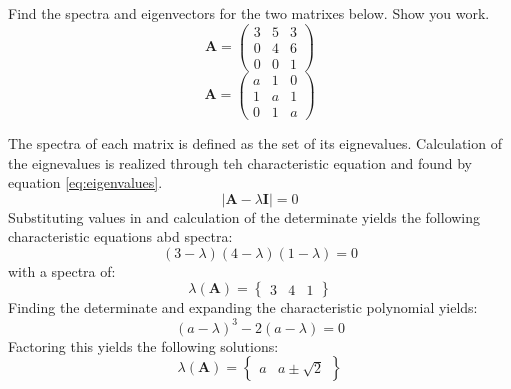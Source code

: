 Find the spectra and eigenvectors for the two matrixes below. Show you work.
\begin{equation*}\boldsymbol{A}=
	\begin{pmatrix}
		3&5&3\\0&4&6\\0&0&1
	\end{pmatrix}
\end{equation*}
\begin{equation*}
	\boldsymbol{A}=
	\begin{pmatrix}
		a&1&0\\1&a&1\\0&1&a
	\end{pmatrix}
\end{equation*}

The spectra of each matrix is defined as the set of its eignevalues. Calculation of the eignevalues is realized through teh characteristic equation and found by equation \ref{eq:eigenvalues}.
\begin{equation}
	\vert \boldsymbol{A}-\lambda\boldsymbol{I}\vert=0
	\label{eq:eigenvalues}
\end{equation}
Substituting values in and calculation of the determinate yields the following characteristic equations abd spectra:
\begin{equation*}
	\left(3-\lambda\right)\left(4-\lambda\right)\left(1-\lambda\right)=0
\end{equation*}
with a spectra of:
\begin{equation*}
	\boxed{
	\lambda\left(\boldsymbol{A}\right)=
	\begin{Bmatrix}
		3&4&1
	\end{Bmatrix}}
\end{equation*}
Finding the determinate and expanding the characteristic polynomial yields:
\begin{equation*}
	\left(a-\lambda\right)^3-2\left(a-\lambda\right)=0
\end{equation*}
Factoring this yields the following solutions:
	\begin{equation*}
	\boxed{
	\lambda\left(\boldsymbol{A}\right)=
		\begin{Bmatrix}
			a& a\pm\sqrt{2}
		\end{Bmatrix}}
	\end{equation*}
	
